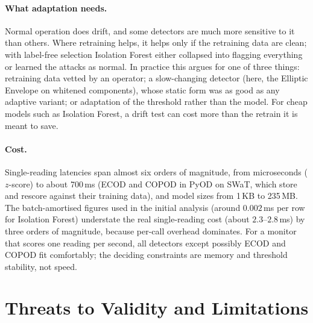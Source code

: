 \documentclass[11pt]{article}
\begin{document}
\paragraph{What adaptation needs.} Normal operation does drift, and some
detectors are much more sensitive to it than others. Where retraining helps, it
helps only if the retraining data are clean; with label-free selection Isolation
Forest either collapsed into flagging everything or learned the attacks as
normal. In practice this argues for one of three things: retraining data vetted
by an operator; a slow-changing detector (here, the Elliptic Envelope on whitened
components), whose static form was as good as any adaptive variant; or adaptation
of the threshold rather than the model. For cheap models such as Isolation Forest, a
drift test can cost more than the retrain it is meant to save.

\paragraph{Cost.} Single-reading latencies span almost six orders of magnitude, from
microseconds ($z$-score) to about 700\,ms (ECOD and COPOD in PyOD on SWaT, which store and
rescore against their training data), and model sizes from 1\,KB to 235\,MB. The
batch-amortised figures used in the initial analysis (around $0.002$\,ms per row for
Isolation Forest) understate the real single-reading cost (about $2.3$--$2.8$\,ms)
by three orders of magnitude, because per-call overhead dominates. For a monitor that
scores one reading per second, all detectors except possibly ECOD and COPOD fit
comfortably; the deciding constraints are memory and threshold stability, not
speed.

\section{Threats to Validity and Limitations}
\label{sec:limits}
\end{document}
